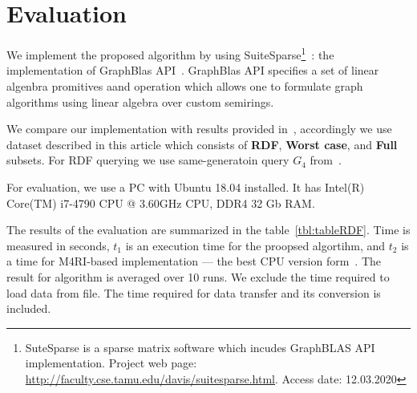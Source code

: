 \section{Evaluation}

We implement the proposed algorithm by using SuiteSparse\footnote{SuteSparse is a sparse matrix software which incudes GraphBLAS API implementation. Project web page: \url{http://faculty.cse.tamu.edu/davis/suitesparse.html}. Access date: 12.03.2020}~\cite{Davis2018Algorithm9S}: the implementation of GraphBlas API~\cite{7761646}. GraphBlas API specifies a set of linear algenbra promitives aand operation which allows one to formulate graph algorithms using linear algebra over custom semirings. 

We compare our implementation with results provided in~\cite{10.1145/3327964.3328503}, accordingly we use dataset described in this article which consists of \textbf{RDF}, \textbf{Worst case}, and \textbf{Full} subsets. For RDF querying we use same-generatoin query $G_4$ from~\cite{10.1145/3327964.3328503}.

For evaluation, we use a PC with Ubuntu 18.04 installed. It has Intel(R) Core(TM) i7-4790 CPU @ 3.60GHz CPU, DDR4 32 Gb RAM.

The results of the evaluation are summarized in the table~\ref{tbl:tableRDF}.
Time is measured in seconds, $t_1$ is an execution time for the proopsed algortihm, and $t_2$ is a time for M4RI-based implementation --- the best CPU version form~\cite{10.1145/3327964.3328503}. The result for algorithm is averaged over 10 runs. We exclude the time required to load data from file. The time required for data transfer and its conversion is included.

